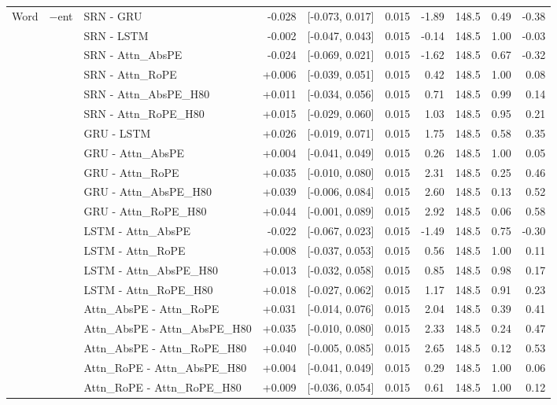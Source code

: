 \begin{longtable}{@{}lllrcrrrrr@{}}
\bottomrule
\endlastfoot
Word & $-$ent & SRN - GRU & -0.028 & [-0.073, 0.017] & 0.015 & -1.89 & 148.5 & 0.49 & -0.38 \\
 &  & SRN - LSTM & -0.002 & [-0.047, 0.043] & 0.015 & -0.14 & 148.5 & 1.00 & -0.03 \\
 &  & SRN - Attn\_AbsPE & -0.024 & [-0.069, 0.021] & 0.015 & -1.62 & 148.5 & 0.67 & -0.32 \\
 &  & SRN - Attn\_RoPE & +0.006 & [-0.039, 0.051] & 0.015 & 0.42 & 148.5 & 1.00 & 0.08 \\
 &  & SRN - Attn\_AbsPE\_H80 & +0.011 & [-0.034, 0.056] & 0.015 & 0.71 & 148.5 & 0.99 & 0.14 \\
 &  & SRN - Attn\_RoPE\_H80 & +0.015 & [-0.029, 0.060] & 0.015 & 1.03 & 148.5 & 0.95 & 0.21 \\
 &  & GRU - LSTM & +0.026 & [-0.019, 0.071] & 0.015 & 1.75 & 148.5 & 0.58 & 0.35 \\
 &  & GRU - Attn\_AbsPE & +0.004 & [-0.041, 0.049] & 0.015 & 0.26 & 148.5 & 1.00 & 0.05 \\
 &  & GRU - Attn\_RoPE & +0.035 & [-0.010, 0.080] & 0.015 & 2.31 & 148.5 & 0.25 & 0.46 \\
 &  & GRU - Attn\_AbsPE\_H80 & +0.039 & [-0.006, 0.084] & 0.015 & 2.60 & 148.5 & 0.13 & 0.52 \\
 &  & GRU - Attn\_RoPE\_H80 & +0.044 & [-0.001, 0.089] & 0.015 & 2.92 & 148.5 & 0.06 & 0.58 \\
 &  & LSTM - Attn\_AbsPE & -0.022 & [-0.067, 0.023] & 0.015 & -1.49 & 148.5 & 0.75 & -0.30 \\
 &  & LSTM - Attn\_RoPE & +0.008 & [-0.037, 0.053] & 0.015 & 0.56 & 148.5 & 1.00 & 0.11 \\
 &  & LSTM - Attn\_AbsPE\_H80 & +0.013 & [-0.032, 0.058] & 0.015 & 0.85 & 148.5 & 0.98 & 0.17 \\
 &  & LSTM - Attn\_RoPE\_H80 & +0.018 & [-0.027, 0.062] & 0.015 & 1.17 & 148.5 & 0.91 & 0.23 \\
 &  & Attn\_AbsPE - Attn\_RoPE & +0.031 & [-0.014, 0.076] & 0.015 & 2.04 & 148.5 & 0.39 & 0.41 \\
 &  & Attn\_AbsPE - Attn\_AbsPE\_H80 & +0.035 & [-0.010, 0.080] & 0.015 & 2.33 & 148.5 & 0.24 & 0.47 \\
 &  & Attn\_AbsPE - Attn\_RoPE\_H80 & +0.040 & [-0.005, 0.085] & 0.015 & 2.65 & 148.5 & 0.12 & 0.53 \\
 &  & Attn\_RoPE - Attn\_AbsPE\_H80 & +0.004 & [-0.041, 0.049] & 0.015 & 0.29 & 148.5 & 1.00 & 0.06 \\
 &  & Attn\_RoPE - Attn\_RoPE\_H80 & +0.009 & [-0.036, 0.054] & 0.015 & 0.61 & 148.5 & 1.00 & 0.12 \\

\end{longtable}

